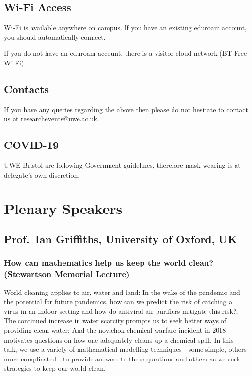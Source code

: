 \documentclass[12pt,a4paper]{article}
\begin{document}
\subsection{Wi-Fi Access}

Wi-Fi is available anywhere on campus. If you have an existing eduroam account, you should automatically connect. 

If you do not have an eduroam account, there is a visitor cloud network (BT Free Wi-Fi).

\subsection{Contacts}

If you have any queries regarding the above then please do not hesitate to contact us at \href{mailto:researchevents@uwe.ac.uk}{researchevents@uwe.ac.uk}.

\subsection{COVID-19}

UWE Bristol are following Government guidelines, therefore mask wearing is at delegate's own discretion.

\section{Plenary Speakers}

\subsection{Prof.~Ian Griffiths, University of Oxford, UK}

\subsubsection{How can mathematics help us keep the world clean? (Stewartson Memorial Lecture)}

World cleaning applies to air, water and land: In the wake of the pandemic and the potential for future pandemics, how can we predict the risk of catching a virus in an indoor setting and how do antiviral air purifiers mitigate this risk?; The continued increase in water scarcity prompts us to seek better ways of providing clean water; And the novichok chemical warfare incident in 2018 motivates questions on how one adequately cleans up a chemical spill. In this talk, we use a variety of mathematical modelling techniques - some simple, others more complicated - to provide answers to these questions and others as we seek strategies to keep our world clean.
\end{document}
